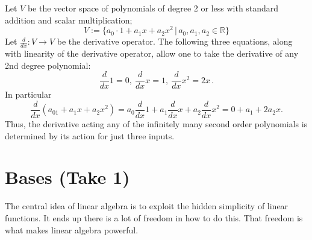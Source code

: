 \begin{example}
Let $V$ be the vector space of polynomials of degree 2 or less with standard addition and scalar multiplication;
\[
V := \{a_0\cdot1 + a_1x + a_2 x^2 \, | \,  a_0,a_1,a_2 \in \mathbb{R} \}
\]
Let $\frac{d}{dx} \colon V\rightarrow V$ be \hypertarget{derivative_linear}{the derivative operator.}  
The following three equations, along with linearity of the derivative operator, allow one to take the derivative of any 2nd degree polynomial:
\[
\frac{d}{dx} 1=0,~\frac{d}{dx}x=1,~\frac{d}{dx}x^2=2x\,. 
\]
In particular
\[
\frac{d}{dx} (a_01 + a_1x + a_2 x^2) = 
 a_0\frac{d}{dx}1 + a_1 \frac{d}{dx} x + a_2 \frac{d}{dx} x^2  
 = 0+a_1+2a_2x.
\]
Thus, the derivative acting any of the infinitely many second order polynomials is determined by its action for just three inputs.

%
\end{example}


\section{Bases (Take 1)} 
The central idea of linear algebra is to exploit the hidden simplicity of linear functions. 
It ends up there is a lot of freedom in how to do this. That freedom is what makes linear algebra powerful.

